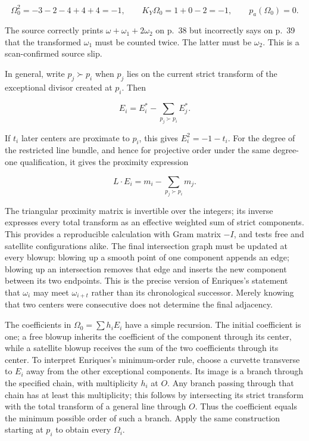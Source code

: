 \[
\Omega_0^2=-3-2-4+4+4=-1,\qquad
K_Y\Omega_0=1+0-2=-1,\qquad p_a(\Omega_0)=0.
\]

The source correctly prints \(\omega+\omega_1+2\omega_2\) on p.~38 but incorrectly says on p.~39 that the transformed \(\omega_1\) must be counted twice. The latter must be \(\omega_2\). This is a scan-confirmed source slip.

In general, write \(p_j\succ p_i\) when \(p_j\) lies on the current strict transform of the exceptional divisor created at \(p_i\). Then

\[
E_i=E_i^*-\sum_{p_j\succ p_i}E_j^*.
\]

If \(t_i\) later centers are proximate to \(p_i\), this gives \(E_i^2=-1-t_i\). For the degree of the restricted line bundle, and hence for projective order under the same degree-one qualification, it gives the proximity expression

\[
L\cdot E_i=m_i-\sum_{p_j\succ p_i}m_j.
\]

The triangular proximity matrix is invertible over the integers; its inverse expresses every total transform as an effective weighted sum of strict components. This provides a reproducible calculation with Gram matrix \(-I\), and tests free and satellite configurations alike. The final intersection graph must be updated at every blowup: blowing up a smooth point of one component appends an edge; blowing up an intersection removes that edge and inserts the new component between its two endpoints. This is the precise version of Enriques's statement that \(\omega_i\) may meet \(\omega_{i+t}\) rather than its chronological successor. Merely knowing that two centers were consecutive does not determine the final adjacency.

The coefficients in \(\Omega_0=\sum h_iE_i\) have a simple recursion. The initial coefficient is one; a free blowup inherits the coefficient of the component through its center, while a satellite blowup receives the sum of the two coefficients through its center. To interpret Enriques's minimum-order rule, choose a curvette transverse to \(E_i\) away from the other exceptional components. Its image is a branch through the specified chain, with multiplicity \(h_i\) at \(O\). Any branch passing through that chain has at least this multiplicity; this follows by intersecting its strict transform with the total transform of a general line through \(O\). Thus the coefficient equals the minimum possible order of such a branch. Apply the same construction starting at \(p_i\) to obtain every \(\Omega_i\).

